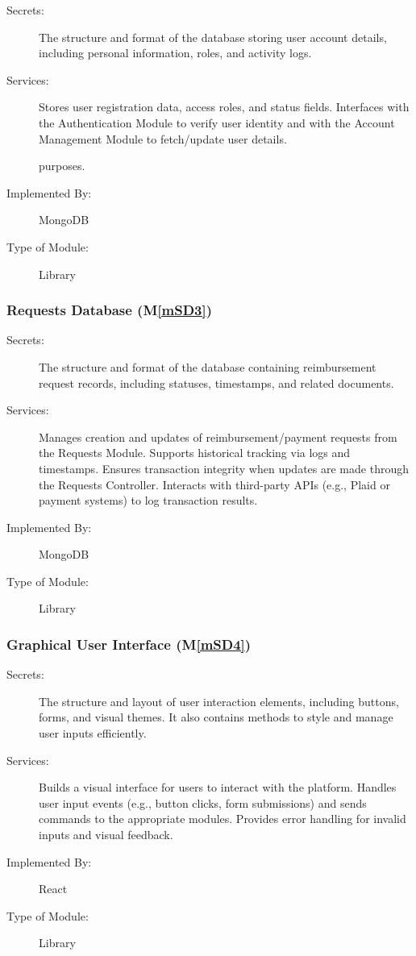 \documentclass[12pt, titlepage]{article}
\newcommand{\mref}[1]{M\ref{#1}}
\begin{document}
\begin{description}
\item[Secrets:] The structure and format of the database storing user account details, including personal information, roles, and activity logs.
\item[Services:] Stores user registration data, access roles, and status fields. Interfaces with the Authentication Module to verify user identity and with the Account Management Module to fetch/update user details. 

purposes.
\item[Implemented By:] MongoDB
\item[Type of Module:] Library
\end{description}

\subsubsection{Requests Database (\mref{mSD3})}

\begin{description}
\item[Secrets:] The structure and format of the database containing reimbursement request records, including statuses, timestamps, and related documents.
\item[Services:] Manages creation and updates of reimbursement/payment requests from the Requests Module. Supports historical tracking via logs and timestamps. Ensures transaction integrity when updates are made through the Requests Controller. Interacts with third-party APIs (e.g., Plaid or payment systems) to log transaction results.
\item[Implemented By:] MongoDB
\item[Type of Module:] Library
\end{description}

\subsubsection{Graphical User Interface (\mref{mSD4})}

\begin{description}
\item[Secrets:] The structure and layout of user interaction elements, including buttons, forms, and visual themes. It also contains methods to style and manage user inputs efficiently.
\item[Services:] Builds a visual interface for users to interact with the platform. Handles user input events (e.g., button clicks, form submissions) and sends commands to the appropriate modules. Provides error handling for invalid inputs and visual feedback.
\item[Implemented By:] React
\item[Type of Module:] Library
\end{description}
\end{document}
